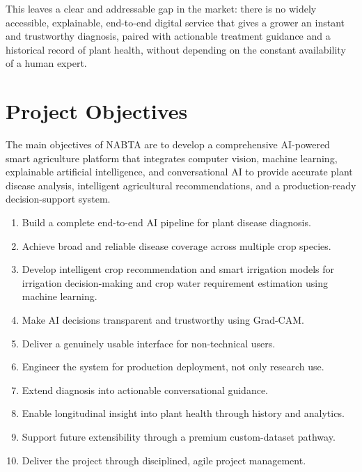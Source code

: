 This leaves a clear and addressable gap in the market: there is no widely accessible, explainable, end-to-end digital service that gives a grower an instant and trustworthy diagnosis, paired with actionable treatment guidance and a historical record of plant health, without depending on the constant availability of a human expert.

\section{Project Objectives}
\label{sec:intro_objectives}

The main objectives of NABTA are to develop a comprehensive AI-powered smart agriculture platform that integrates computer vision, machine learning, explainable artificial intelligence, and conversational AI to provide accurate plant disease analysis, intelligent agricultural recommendations, and a production-ready decision-support system.

\begin{enumerate}[leftmargin=*,label=\textbf{O\arabic*.}]
\item Build a complete end-to-end AI pipeline for plant disease diagnosis.
\item Achieve broad and reliable disease coverage across multiple crop species.
\item Develop intelligent crop recommendation and smart irrigation models for irrigation decision-making and crop water requirement estimation using machine learning.
\item Make AI decisions transparent and trustworthy using Grad-CAM.
\item Deliver a genuinely usable interface for non-technical users.
\item Engineer the system for production deployment, not only research use.
\item Extend diagnosis into actionable conversational guidance.
\item Enable longitudinal insight into plant health through history and analytics.
\item Support future extensibility through a premium custom-dataset pathway.
\item Deliver the project through disciplined, agile project management.
\end{enumerate}

